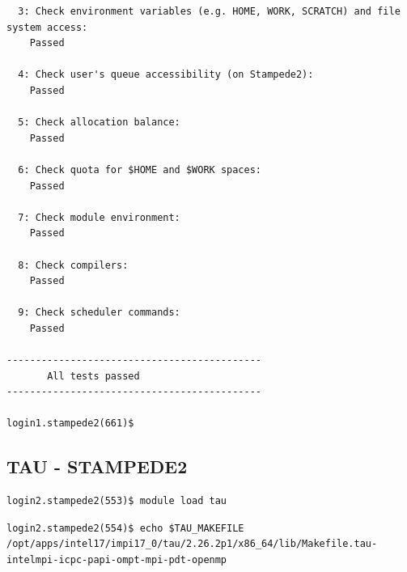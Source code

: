 \documentclass{article}
\begin{document}
\begin{itemize}
\begin{verbatim}
  3: Check environment variables (e.g. HOME, WORK, SCRATCH) and file system access:
	Passed

  4: Check user's queue accessibility (on Stampede2):
	Passed

  5: Check allocation balance:
	Passed

  6: Check quota for $HOME and $WORK spaces:
	Passed

  7: Check module environment:
	Passed

  8: Check compilers:
	Passed

  9: Check scheduler commands:
	Passed

--------------------------------------------
       All tests passed
--------------------------------------------

login1.stampede2(661)$ 
\end{verbatim}
\normalsize
\end{itemize}

\subsection{TAU - STAMPEDE2}
\begin{verbatim}
login2.stampede2(553)$ module load tau
\end{verbatim}
\begin{verbatim}
login2.stampede2(554)$ echo $TAU_MAKEFILE
/opt/apps/intel17/impi17_0/tau/2.26.2p1/x86_64/lib/Makefile.tau-intelmpi-icpc-papi-ompt-mpi-pdt-openmp
\end{verbatim}
\end{document}
